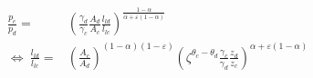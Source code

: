 \begin{align}
	\frac{p_c}{p_d} =&\left(\frac{\gamma_d}{\gamma_c}\frac{A_d}{A_c}\frac{l_{ld}}{l_{lc}}\right)^{\frac{1-\alpha}{\alpha+\varepsilon(1-\alpha)}}\\ %
\Leftrightarrow\ 	\frac{l_{ld}}{l_{lc}}=&%
	\left(\frac{A_c}{A_d}\right)^{(1-\alpha)(1-\varepsilon)}\left(\zeta^{\theta_c-\theta_d}\frac{\gamma_c}{\gamma_d}\frac{z_d}{z_c}\right)^{\alpha+\varepsilon(1-\alpha)}\label{eq:lldllc}%
\end{align}

